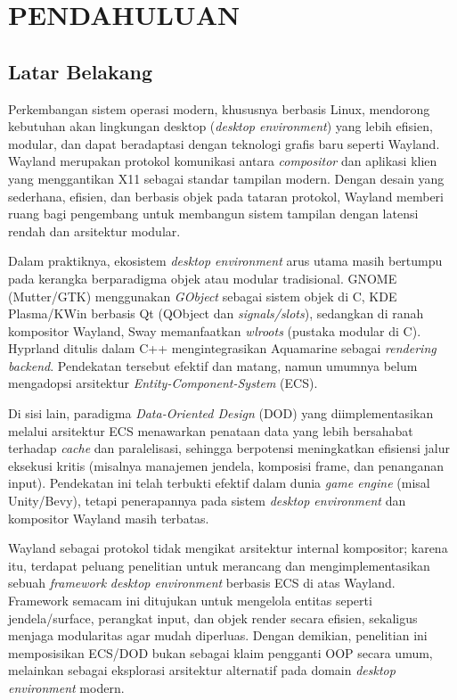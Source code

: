\newpage
\chapter{PENDAHULUAN} \label{Bab I}

\section{Latar Belakang} \label{I.Latar Belakang}
Perkembangan sistem operasi modern, khususnya berbasis Linux, mendorong kebutuhan akan lingkungan desktop (\textit{desktop environment}) yang lebih efisien, modular, dan dapat beradaptasi dengan teknologi grafis baru seperti Wayland. Wayland merupakan protokol komunikasi antara \textit{compositor} dan aplikasi klien yang menggantikan X11 sebagai standar tampilan modern. Dengan desain yang sederhana, efisien, dan berbasis objek pada tataran protokol, Wayland memberi ruang bagi pengembang untuk membangun sistem tampilan dengan latensi rendah dan arsitektur modular. \par

Dalam praktiknya, ekosistem \textit{desktop environment} arus utama masih bertumpu pada kerangka berparadigma objek atau modular tradisional. GNOME (Mutter/GTK) menggunakan \textit{GObject} sebagai sistem objek di C, KDE Plasma/KWin berbasis Qt (QObject dan \textit{signals/slots}), sedangkan di ranah kompositor Wayland, Sway memanfaatkan \textit{wlroots} (pustaka modular di C). Hyprland ditulis dalam C++ mengintegrasikan Aquamarine sebagai \textit{rendering backend}. Pendekatan tersebut efektif dan matang, namun umumnya belum mengadopsi arsitektur \textit{Entity-Component-System} (ECS). \par

Di sisi lain, paradigma \textit{Data-Oriented Design} (DOD) yang diimplementasikan melalui arsitektur ECS menawarkan penataan data yang lebih bersahabat terhadap \textit{cache} dan paralelisasi, sehingga berpotensi meningkatkan efisiensi jalur eksekusi kritis (misalnya manajemen jendela, komposisi frame, dan penanganan input). Pendekatan ini telah terbukti efektif dalam dunia \textit{game engine} (misal Unity/Bevy), tetapi penerapannya pada sistem \textit{desktop environment} dan kompositor Wayland masih terbatas. \par

Wayland sebagai protokol tidak mengikat arsitektur internal kompositor; karena itu, terdapat peluang penelitian untuk merancang dan mengimplementasikan sebuah \textit{framework} \textit{desktop environment} berbasis ECS di atas Wayland. Framework semacam ini ditujukan untuk mengelola entitas seperti jendela/surface, perangkat input, dan objek render secara efisien, sekaligus menjaga modularitas agar mudah diperluas. Dengan demikian, penelitian ini memposisikan ECS/DOD bukan sebagai klaim pengganti OOP secara umum, melainkan sebagai eksplorasi arsitektur alternatif pada domain \textit{desktop environment} modern. \par

